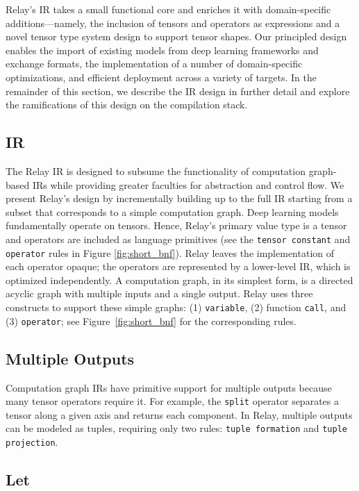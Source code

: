 Relay's IR takes a small functional core and enriches it with domain-specific additions---namely,
  the inclusion of tensors and operators as expressions
  and a novel tensor type system design to support tensor shapes.
Our principled design
  enables the import of existing models from deep learning frameworks and exchange formats,
  the implementation of a number of domain-specific optimizations,
  and efficient deployment across a variety of targets.
In the remainder of this section,
  we describe the IR design in further detail
  and explore the ramifications of this design on the compilation stack.

\subsection{IR}


The Relay IR is designed
  to subsume the functionality of computation graph-based IRs
  while providing greater faculties for abstraction and control flow.
We present Relay's design by incrementally building up to the full IR
  starting from a subset that corresponds to a simple computation graph.
Deep learning models fundamentally operate on tensors.
Hence, Relay's primary value type is a tensor and operators are included as language primitives
  (see the \verb|tensor constant| and \verb|operator| rules in Figure \ref{fig:short_bnf}).
Relay leaves the implementation of each operator opaque; the operators
  are represented by a lower-level IR, which is optimized independently.
A computation graph, in its simplest form, is a directed acyclic
  graph with multiple inputs and a single output.
Relay uses three constructs to support these simple graphs:
  (1) \verb|variable|, (2) function \verb|call|,
  and (3) \verb|operator|; see Figure~\ref{fig:short_bnf} for the corresponding rules.

\subsection*{Multiple Outputs}

Computation graph IRs have primitive support for multiple outputs
  because many tensor operators require it.
For example, the \verb|split| operator separates a tensor along a given axis
  and returns each component.
In Relay, multiple outputs can be modeled as tuples,
  requiring only two rules: \verb|tuple formation| and \verb|tuple projection|.

\subsection*{Let}

